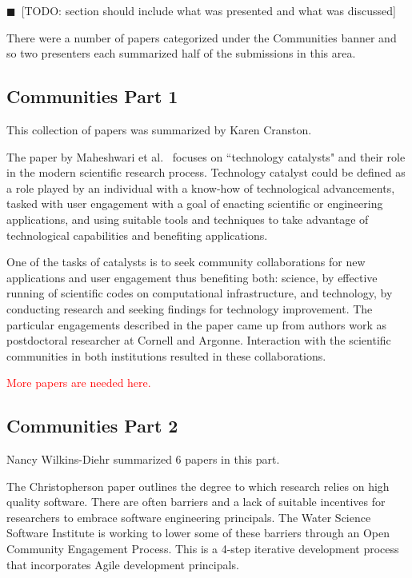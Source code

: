 \documentclass[11pt, oneside]{amsart}
\newcommand{\todo}[1]{{\color{blue}$\blacksquare$~\textsf{[TODO: #1]}}}
\newcommand{\note}[1]{ {\textcolor{red}    { #1 }}}
\begin{document}
\todo{section should include what was presented and what was discussed}

There were a number of papers categorized under the Communities banner and so two presenters each summarized half of the submissions in this area.

\subsection{Communities Part 1}

This collection of papers was summarized by Karen Cranston.

The paper by Maheshwari et al.~\cite{Maheshwari_WSSSPE} focuses on
``technology catalysts" and their role in the modern
scientific research process. Technology catalyst could be defined as a role
played by an individual with a know-how of technological advancements, tasked
with user engagement with a goal of enacting scientific or engineering
applications, and using suitable tools and techniques to take advantage of
technological capabilities and benefiting applications.

One of the tasks of catalysts is to seek community collaborations for new
applications and user engagement thus benefiting both: science, by effective
running of scientific codes on computational infrastructure, and technology,
by conducting research and seeking findings for technology improvement.
The particular engagements described in the paper came up from authors work as
postdoctoral researcher at Cornell and Argonne. Interaction with the scientific
communities in both institutions resulted in these collaborations.

\note{More papers are needed here.}

\subsection{Communities Part 2}

Nancy Wilkins-Diehr summarized 6 papers in this part.

The Christopherson paper outlines the degree to which research relies on high
quality software. There are often barriers and a lack of suitable incentives
for researchers to embrace software engineering principals. The Water Science
Software Institute is working to lower some of these barriers through an Open
Community Engagement Process. This is a 4-step iterative development process
that incorporates Agile development principals.
\end{document}
